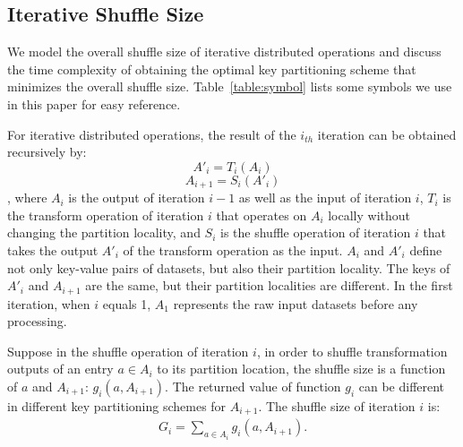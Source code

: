 \documentclass[10pt,journal,compsoc]{IEEEtran}
\begin{document}



\subsection{Iterative Shuffle Size}\label{section:model}
We model the overall shuffle size of iterative
distributed operations and discuss the time complexity of obtaining
the optimal key partitioning scheme that minimizes the overall shuffle
size. Table~\ref{table:symbol} lists some symbols we use in this paper
for easy reference. 

For iterative distributed operations, the result of the $i_{th}$
iteration can be obtained recursively by:
\begin{equation*}\label{eq:t}
A'_i=T_i(A_i)
\end{equation*}
\begin{equation*}\label{eq:s}
A_{i+1}=S_i(A'_i)
\end{equation*}
, where $A_i$ is the output of iteration $i-1$ as well as the input of iteration $i$, 
$T_i$ is the transform operation of iteration $i$ that operates on $A_i$ locally without changing the partition locality, 
and $S_i$ is the shuffle operation of iteration $i$ that takes the output $A'_i$ of the transform operation as the input.  
$A_i$ and $A'_i$ define not only key-value pairs of datasets, but also their partition locality. 
The keys of $A'_i$ and $A_{i+1}$ are the same, but their partition localities are different. 
In the first iteration, when $i$ equals 1, 
$A_1$ represents the raw input datasets before any processing.  

Suppose in the shuffle operation of iteration $i$, in order to shuffle transformation outputs of an entry $a \in A_i$ to its partition location, 
the shuffle size is a function of $a$ and $A_{i+1}$: $g_i(a,A_{i+1})$. 
The returned value of function $g_i$ can be different in different key partitioning schemes for $A_{i+1}$. 
The shuffle size of iteration $i$ is: 
\begin{equation*}\label{eq:gi}
\begin{aligned}
G_i=\sum_{a \in A_i} g_i(a,A_{i+1}).
\end{aligned}
\end{equation*}
\end{document}
